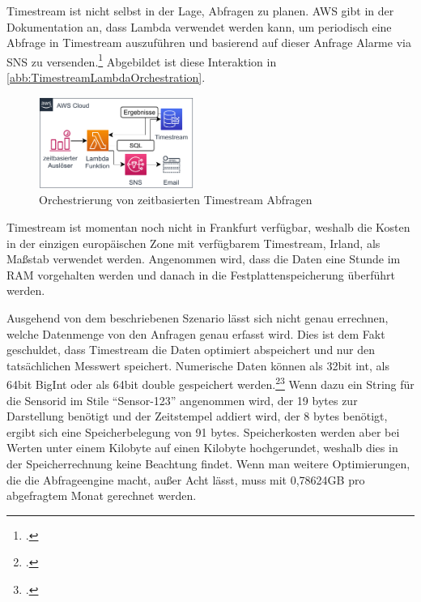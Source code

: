 Timestream ist nicht selbst in der Lage, Abfragen zu planen. \ac{AWS} gibt in der Dokumentation an, dass Lambda verwendet werden kann, um periodisch eine Abfrage in Timestream auszuführen und basierend auf dieser Anfrage Alarme via \ac{SNS} zu versenden.\footcite[Vgl.][]{AmazonWebServicesInc..o.J.ag} Abgebildet ist diese Interaktion in \autoref{abb:TimestreamLambdaOrchestration}.


\begin{figure}[H]
\centering
\includegraphics[width=0.45\textwidth]{graphics/Lambda-Timestream-Orchestration.pdf}
\caption{Orchestrierung von zeitbasierten Timestream Abfragen}
\label{abb:TimestreamLambdaOrchestration}
\end{figure}

Timestream ist momentan noch nicht in Frankfurt verfügbar, weshalb die Kosten in der einzigen europäischen Zone mit verfügbarem Timestream, Irland, als Maßstab verwendet werden. Angenommen wird, dass die Daten eine Stunde im \ac{RAM} vorgehalten werden und danach in die Festplattenspeicherung überführt werden.

Ausgehend von dem beschriebenen Szenario lässt sich nicht genau errechnen, welche Datenmenge von den Anfragen genau erfasst wird. Dies ist dem Fakt geschuldet, dass Timestream die Daten optimiert abspeichert und nur den tatsächlichen Messwert speichert. Numerische Daten können als 32bit int, als 64bit BigInt oder als 64bit double gespeichert werden.\footcite[Vgl. auch im Folgenden][]{AmazonWebServicesInc..o.J.r}\nzitat\footcite[Vgl. auch im Folgenden][]{AmazonWebServicesInc..o.J.q} Wenn dazu ein String für die Sensorid im Stile \enquote{Sensor-123} angenommen wird, der 19 bytes zur Darstellung benötigt und der Zeitstempel addiert wird, der 8 bytes benötigt, ergibt sich eine Speicherbelegung von 91 bytes. Speicherkosten werden aber bei Werten unter einem Kilobyte auf einen Kilobyte hochgerundet, weshalb dies in der Speicherrechnung keine Beachtung findet. Wenn man weitere Optimierungen, die die Abfrageengine macht, außer Acht lässt, muss mit 0,78624GB pro abgefragtem Monat gerechnet werden.



